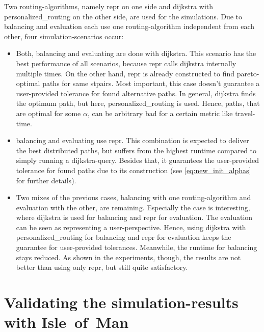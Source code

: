     Two routing-algorithms, namely \gls{repr} on one side and \gls{dijkstra} with \gls{personalized_routing} on the other side, are used for the simulations.
    Due to \gls{balancing} and evaluation each use one routing-algorithm independent from each other, four simulation-scenarios occur:
    \begin{itemize}
        \item Both, \gls{balancing} and evaluating are done with \gls{dijkstra}.
            This scenario has the best performance of all scenarios, because \gls{repr} calls \gls{dijkstra} internally multiple times.
            On the other hand, \gls{repr} is already constructed to find pareto-optimal paths for same \glspl{stpair}.
            Most important, this case doesn't guarantee a user-provided tolerance for found alternative paths.
            In general, \gls{dijkstra} finds the optimum path, but here, \gls{personalized_routing} is used.
            Hence, paths, that are optimal for some $\alpha$, can be arbitrary bad for a certain \gls{metric} like travel-time.
        \item \Gls{balancing} and evaluating use \gls{repr}.
            This combination is expected to deliver the best distributed paths, but suffers from the highest runtime compared to simply running a \gls{dijkstra}-query.
            Besides that, it guarantees the user-provided tolerance for found paths due to its construction (see \vref{eq:new_init_alphas} for further details).
        \item Two mixes of the previous cases, \gls{balancing} with one routing-algorithm and evaluation with the other, are remaining.
            Especially the case is interesting, where \gls{dijkstra} is used for \gls{balancing} and \gls{repr} for evaluation.
            The evaluation can be seen as representing a user-perspective.
            Hence, using \gls{dijkstra} with \gls{personalized_routing} for \gls{balancing} and \gls{repr} for evaluation keeps the guarantee for user-provided tolerances.
            Meanwhile, the runtime for \gls{balancing} stays reduced.
            As shown in the experiments, though, the results are not better than using only \gls{repr}, but still quite satisfactory.
    \end{itemize}

\section{Validating the simulation-results with Isle~of~Man}

